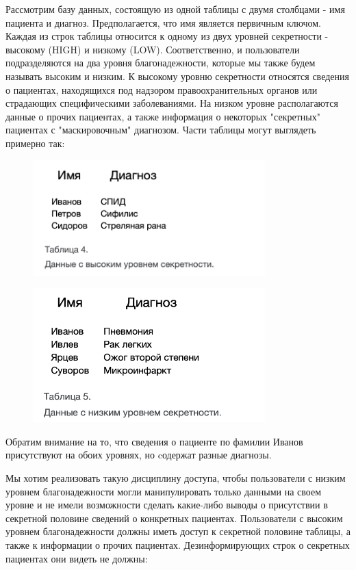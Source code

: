 Рассмотрим базу данных, состоящую из одной таблицы с двумя столбцами - имя пациента и диагноз.
Предполагается, что имя является первичным ключом. Каждая из строк таблицы относится к одному
из двух уровней секретности - высокому (HIGH) и низкому (LOW). Соответственно, и пользователи
подразделяются на два уровня благонадежности, которые мы также будем называть высоким и низким.
К высокому уровню секретности относятся сведения о пациентах, находящихся под надзором
правоохранительных органов или страдающих специфическими заболеваниями. На низком уровне
располагаются данные о прочих пациентах, а также информация о некоторых "секретных" пациентах
с "маскировочным" диагнозом. Части таблицы могут выглядеть примерно так:

\begin{figure}[h]
    \centering
    \includegraphics[width=0.8\textwidth]{assets/diagnoses1.png}
\end{figure}

\begin{figure}[h]
    \centering
    \includegraphics[width=0.8\textwidth]{assets/diagnoses2.png}
\end{figure}

Обратим внимание на то, что сведения о пациенте по фамилии Иванов присутствуют на обоих уровнях,
но cодержат разные диагнозы.

Мы хотим реализовать такую дисциплину доступа, чтобы пользователи с низким уровнем благонадежности
могли манипулировать только данными на своем уровне и не имели возможности сделать какие-либо
выводы о присутствии в секретной половине сведений о конкретных пациентах. Пользователи с высоким
уровнем благонадежности должны иметь доступ к секретной половине таблицы, а также к информации о
прочих пациентах. Дезинформирующих строк о секретных пациентах они видеть не должны:

